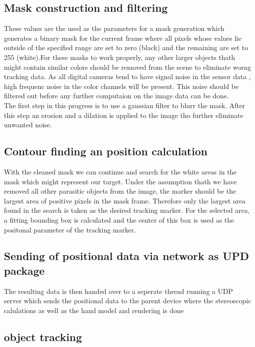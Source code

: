 \subsection{Mask construction and filtering}
These values are the used as the parameters for a mask generation which generates a binary mask for the current frame where all pixels whose values lie outside of the specified range are set to zero (black) and the remaining are set to 255 (white).For these masks to work properly, any other larger objects thath might contain similar colors should be removed from the scene to eliminate worng tracking data. As all digital cameras tend to have signal noise in the sensor data , high frequenc  noise in the color channels will be present. This noise should be filtered out before any further computaion on the image data can be done.\\
The first step in this progress is to use a gaussian filter to blurr the mask. After this step an erosion and a dilation is applied to the image tho further eliminate unwanted noise.
\subsection{Contour finding an position calculation}
With the cleaned mask we can continue and search for the white areas in the mask which might represent our target. Under the assumption thath we have removed all other parasitic objects from the image, the marker should be the largest area of positive pixels in the mask frame. Therefore only the largest area found in the search is taken as the desired tracking marker. For the selected area, a fitting bounding box is calculated and the center of this box is used as the positonal parameter of the tracking marker.
\subsection{Sending of positional data via network as UPD package}
The resulting data is then handed over to a seperate thread running a UDP server which sends the positional data to the parent device where the stereoscopic calulations as well as the hand model and rendering is done
\subsection{object tracking}



 




